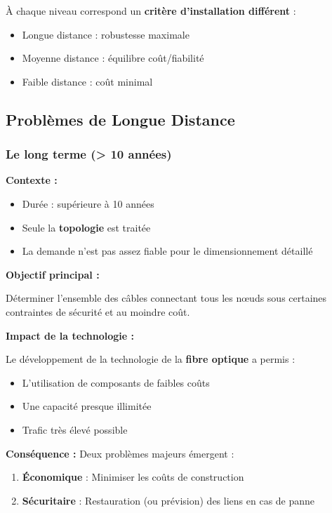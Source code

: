 \documentclass[12pt,a4paper]{article}
\begin{document}
\begin{astuce}
À chaque niveau correspond un \textcolor{titrebleu}{\textbf{critère d'installation différent}} :
\begin{itemize}
    \item Longue distance : robustesse maximale
    \item Moyenne distance : équilibre coût/fiabilité
    \item Faible distance : coût minimal
\end{itemize}
\end{astuce}

\newpage
\subsection{Problèmes de Longue Distance}

\subsubsection{Le long terme (> 10 années)}

\begin{definition}
\textbf{Contexte :}
\begin{itemize}
    \item Durée : supérieure à 10 années
    \item Seule la \textcolor{titrebleu}{\textbf{topologie}} est traitée
    \item La demande n'est pas assez fiable pour le dimensionnement détaillé
\end{itemize}

\textbf{Objectif principal :}

Déterminer l'ensemble des câbles connectant tous les nœuds sous certaines contraintes de sécurité et au moindre coût.
\end{definition}

\begin{notecours}
\textbf{Impact de la technologie :}

Le développement de la technologie de la \textcolor{defvert}{\textbf{fibre optique}} a permis :
\begin{itemize}
    \item L'utilisation de composants de faibles coûts
    \item Une capacité presque illimitée
    \item Trafic très élevé possible
\end{itemize}

\textbf{Conséquence :} Deux problèmes majeurs émergent :
\begin{enumerate}
    \item \textcolor{titrebleu}{\textbf{Économique}} : Minimiser les coûts de construction
    \item \textcolor{importantrouge}{\textbf{Sécuritaire}} : Restauration (ou prévision) des liens en cas de panne
\end{enumerate}
\end{notecours}
\end{document}
